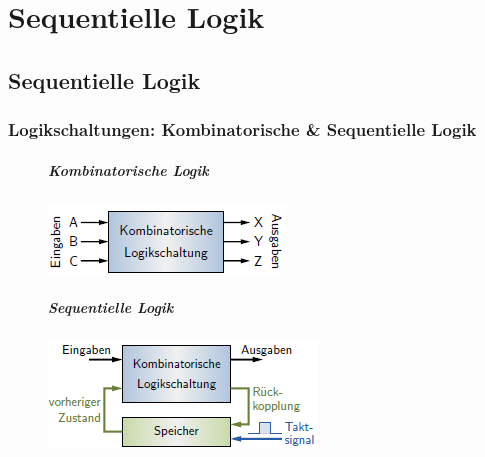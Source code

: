 \documentclass[12pt]{report}
\begin{document}
\chapter{Sequentielle Logik}
\section{Sequentielle Logik}
\subsection{Logikschaltungen: Kombinatorische \& Sequentielle Logik}
\begin{figure}[H]
  \begin{minipage}[t]{0.48\textwidth}
    \paragraph{Kombinatorische Logik}
    
    \centering
    
    \includegraphics[width=\textwidth]{../graphics/kombinatorische_logik}
    
  \end{minipage}
  \hfill
  \begin{minipage}[t]{0.48\textwidth}
    \paragraph{Sequentielle Logik}
    
    \centering
    
    \includegraphics[width=\textwidth]{../graphics/sequentielle_logik}
  \end{minipage}
\end{figure}
\end{document}
